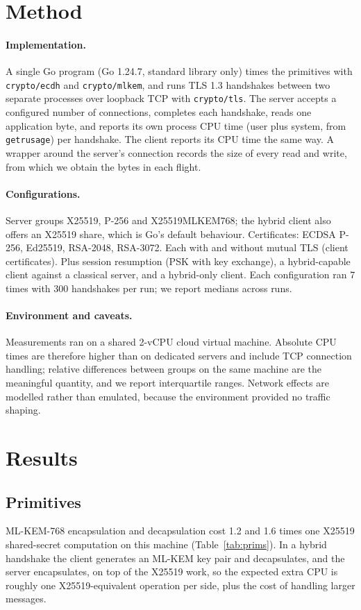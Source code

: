 \documentclass[11pt]{article}
\begin{document}
\section{Method}
\paragraph{Implementation.} A single Go program (Go 1.24.7, standard library only) times the primitives with \texttt{crypto/ecdh} and
\texttt{crypto/mlkem}, and runs TLS 1.3 handshakes between two separate processes over loopback TCP with \texttt{crypto/tls}. The server
accepts a configured number of connections, completes each handshake, reads one application byte, and reports its own process CPU time
(user plus system, from \texttt{getrusage}) per handshake. The client reports its CPU time the same way. A wrapper around the server's
connection records the size of every read and write, from which we obtain the bytes in each flight.

\paragraph{Configurations.} Server groups X25519, P-256 and X25519MLKEM768; the hybrid client also offers an X25519 share, which is Go's
default behaviour. Certificates: ECDSA P-256, Ed25519, RSA-2048, RSA-3072. Each with and without mutual TLS (client certificates). Plus
session resumption (PSK with key exchange), a hybrid-capable client against a classical server, and a hybrid-only client. Each
configuration ran 7 times with 300 handshakes per run; we report medians across runs.

\paragraph{Environment and caveats.} Measurements ran on a shared 2-vCPU cloud virtual machine. Absolute CPU times are therefore higher
than on dedicated servers and include TCP connection handling; relative differences between groups on the same machine are the
meaningful quantity, and we report interquartile ranges. Network effects are modelled rather than emulated, because the environment
provided no traffic shaping.

\section{Results}
\subsection{Primitives}

ML-KEM-768 encapsulation and decapsulation cost 1.2 and 1.6 times one X25519 shared-secret computation on this machine (Table~\ref{tab:prims}). In a
hybrid handshake the client generates an ML-KEM key pair and decapsulates, and the server encapsulates, on top of the X25519 work, so the
expected extra CPU is roughly one X25519-equivalent operation per side, plus the cost of handling larger messages.
\end{document}
